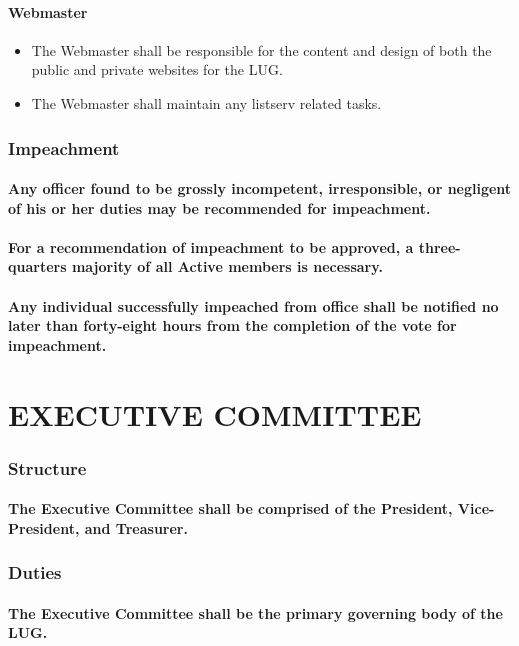 \documentclass[letter]{report}
\begin{document}
\subsection{Webmaster}
\begin{itemize}
\item The Webmaster shall be responsible for the content and design of both the public and private websites for the LUG.
\item The Webmaster shall maintain any listserv related tasks.
\end{itemize}

\section{Impeachment}
\subsection{Any officer found to be grossly incompetent, irresponsible, or negligent of his or her duties may be recommended for impeachment.}
\subsection{For a recommendation of impeachment to be approved, a three-quarters majority of all Active members is necessary.}
\subsection{Any individual successfully impeached from office shall be notified no later than forty-eight hours from the completion of the vote for impeachment.}

\part{EXECUTIVE COMMITTEE}
\section{Structure}
\subsection{The Executive Committee shall be comprised of the President, Vice-President, and Treasurer.}
\section{Duties}
\subsection{The Executive Committee shall be the primary governing body of the LUG.}
\end{document}
